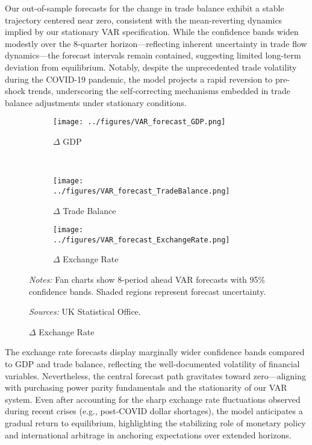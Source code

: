 \documentclass[
]{article}
\begin{document}
Our out-of-sample forecasts for the change in trade balance exhibit a stable trajectory 
centered near zero, consistent with the mean-reverting dynamics implied by our 
stationary VAR specification. While the confidence bands widen modestly
over the 8-quarter horizon—reflecting inherent uncertainty in trade flow
dynamics—the forecast intervals remain contained, suggesting limited long-term 
deviation from equilibrium. Notably, despite the unprecedented trade volatility 
during the COVID-19 pandemic, the model projects a rapid reversion to pre-shock 
trends, underscoring the self-correcting mechanisms embedded in trade balance 
adjustments under stationary conditions.

\begin{figure}[!htbp]
\centering
\caption{\textsc{VAR Forecasts Performance}}
\label{fig:var_forecasts}

\begin{subfigure}[b]{0.32\textwidth}
    \centering
    \texttt{[image: ../figures/VAR\_forecast\_GDP.png]}
    \caption{$\Delta$ GDP}
    \label{fig:forecast_gdp}
\end{subfigure}
\\
\begin{subfigure}[b]{0.32\textwidth}
    \centering
    \texttt{[image: ../figures/VAR\_forecast\_TradeBalance.png]}
    \caption{$\Delta$ Trade Balance}
    \label{fig:forecast_tb}
\end{subfigure}
\begin{subfigure}[b]{0.32\textwidth}
    \centering
    \texttt{[image: ../figures/VAR\_forecast\_ExchangeRate.png]}
    \caption{$\Delta$ Exchange Rate}
    \label{fig:forecast_fx}
\end{subfigure}

\begin{minipage}{\textwidth}
\footnotesize
\textit{Notes:} Fan charts show 8-period ahead VAR forecasts with 95\% confidence bands. 
Shaded regions represent forecast uncertainty. 

\textit{Sources:} UK Statistical Office.
\end{minipage}
\end{figure}

The exchange rate forecasts display marginally wider confidence bands compared 
to GDP and trade balance, reflecting the well-documented volatility of financial 
variables. Nevertheless, the central forecast path gravitates toward 
zero—aligning with purchasing power parity fundamentals and the stationarity of 
our VAR system. Even after accounting for the sharp exchange rate fluctuations 
observed during recent crises (e.g., post-COVID dollar shortages), the model 
anticipates a gradual return to equilibrium, highlighting the stabilizing role 
of monetary policy and international arbitrage in anchoring expectations over extended horizons.
\end{document}
